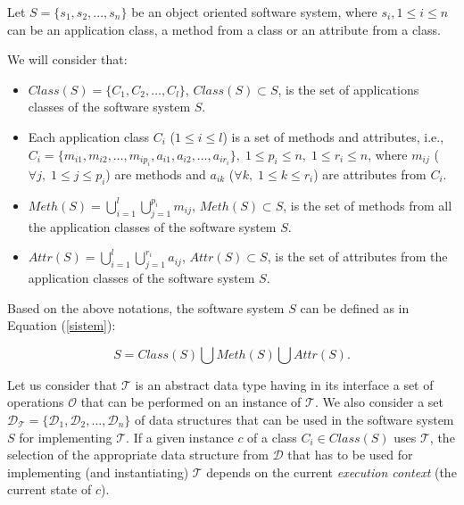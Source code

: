 Let $S=\{s_1, s_2, ..., s_n\}$ be an object oriented software system, where $s_i, 1 \le i \le n$ can be an application class, a method from a class or an attribute from a class.

We will consider that:

\begin{itemize}

\item $Class(S)=\{C_{1}, C_{2}, \dots , C_{l}\}$, $Class(S) \subset S$, is the set of applications classes of the software system $S$.

\item Each application class $C_i$ ($1 \le i \le l$) is a set of methods and attributes, i.e., $C_i=\{m_{i1}, m_{i2}, \dots , m_{ip_{i}}, a_{i1}, a_{i2}, \dots , a_{ir_{i}} \}, \; 1 \le p_i \le n, \; 1 \le r_i \le n$, where $m_{ij}$ ($\forall j,\; 1 \le j \le p_i$) are methods  and $a_{ik}$ ($\forall k, \; 1 \le k \le r_i$) are attributes from $C_i$.

\item $Meth(S)= \displaystyle\bigcup_{i=1}^{l}\displaystyle\bigcup_{j=1}^{p_i}{m_{ij}}$, $Meth(S) \subset S$, is the set of methods from all the application classes of the software system $S$.

\item $Attr(S)= \displaystyle\bigcup_{i=1}^{l}\displaystyle\bigcup_{j=1}^{r_i}{a_{ij}}$, $Attr(S) \subset S$, is the set of attributes from the application classes of the software system $S$.

\end{itemize}

Based on the above notations, the software system $S$ can be defined as in Equation (\ref{sistem}):

\begin{equation}\label{sistem}
S=Class(S)\bigcup Meth(S) \bigcup Attr(S).
\end{equation}

Let us consider that $\mathcal{T}$ is an abstract data type having in its interface a set of operations $\mathcal{O}$ that can be performed on an instance of $\mathcal{T}$. We also consider a set $\mathcal{D}_\mathcal{T}=\{\mathcal{D}_1, \mathcal{D}_2, ... , \mathcal{D}_n\}$ of data structures that can be  used in the software system $S$ for implementing $\mathcal{T}$. If a given instance $c$ of a class  $C_{i} \in Class(S)$  uses  $\mathcal{T}$, the selection of the appropriate data structure from $\mathcal{D}$ that has to be used for implementing (and instantiating) $\mathcal{T}$ depends on the current \emph{execution context} (the current state of $c$).


